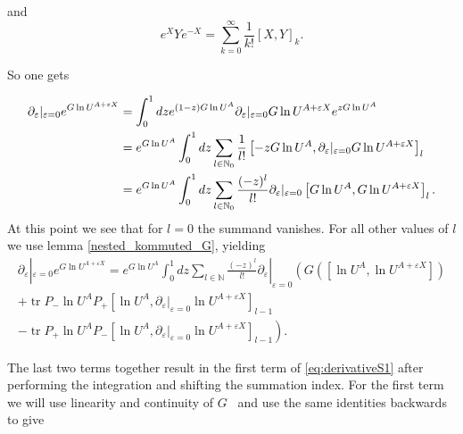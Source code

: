 \documentclass[b5paper,draft,openbib,12pt]{memoir}
\DeclareMathOperator{\tr}{tr}
\begin{document}
and
\begin{equation}\tag{Hadamard's formula}\label{Hadamard}
e^{X}Ye^{-X}=\sum_{k=0}^\infty \frac{1}{k!} [X,Y]_k.
\end{equation}

So one gets

\begin{align}\label{proof:duhamelApplied}
\partial_\varepsilon |_{\varepsilon=0} e^{G \ln U^{A+\varepsilon X}} &= \int_0^1 d z e^{(1-z) G \ln U^A} \partial_\varepsilon |_{\varepsilon=0} G \ln U^{A+\varepsilon X} e^{z G \ln U^A}\\\notag
&=e^{G \ln U^A} \int_0^1 d z \sum_{l\in\mathbb{N}_0} \frac{1}{l!} \left[ - z G \ln U^A, \partial_\varepsilon |_{\varepsilon=0} G \ln U^{A+\varepsilon X} \right]_l\\\notag
&=e^{G \ln U^A} \int_0^1 d z \sum_{l\in\mathbb{N}_0} \frac{(-z)^l}{l!} \partial_\varepsilon |_{\varepsilon=0} \left[  G \ln U^A,  G \ln U^{A+\varepsilon X} \right]_l.
\end{align}
At this point we see that for \(l=0\) the summand vanishes. For all other values of \(l\) we use lemma \ref{nested_kommuted_G}, yielding
\begin{multline}
\partial_\varepsilon |_{\varepsilon=0} e^{G \ln U^{A+\varepsilon X}}= 
e^{G \ln U^A} \int_0^1 d z \sum_{l\in\mathbb{N}} \frac{(-z)^l}{l!} \partial_\varepsilon |_{\varepsilon=0} \left( G\left(\left[ \ln U^A, \ln U^{A+\varepsilon X}\right]\right) \right.\\
+\tr P_- \ln U^A P_+ \left[ \ln U^A, \partial_\varepsilon |_{\varepsilon=0} \ln U^{A+\varepsilon X}\right]_{l-1}\\
\left. - \tr P_+ \ln U^A P_- \left[ \ln U^A, \partial_\varepsilon |_{\varepsilon=0} \ln U^{A+\varepsilon X}\right]_{l-1}\right).
\end{multline}

The last two terms together result in the first term of \eqref{eq:derivativeS1} after performing the integration and shifting the summation
index. For the first term we will use linearity and continuity of \(G\)   ~and use the same identities backwards to give
\end{document}
